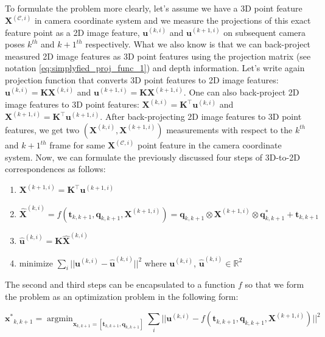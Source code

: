 \documentclass[a4paper]{report}
\numberwithin{figure}{section}
\newcommand{\argmin}{\mathop{\mathrm{argmin}}}
\newcommand{\R}{\mathbb{R}}
\begin{document}
To formulate the problem more clearly, let's assume we have a 3D point feature 
$\mathbf{X}^{(\mathcal{C}, i)}$ in camera coordinate system and 
we measure 
the projections of this exact feature point as a 2D image feature, 
$\mathbf{u}^{(k,i)}$ and $\mathbf{u}^{(k+1,i)}$ on subsequent 
camera poses $k^{th}$ and $k+1^{th}$ respectively. What we also know is that 
we can back-project measured 2D image features as 3D point features using 
the projection matrix (see notation \eqref{eq:simplyfied_proj_func_1}) and 
depth 
information. Let's write again projection function that converts 3D point 
features to 2D image features: $\mathbf{u}^{(k,i)} = 
\mathbf{K}\mathbf{X}^{(k,i)}$ and $\mathbf{u}^{(k+1,i)} = 
\mathbf{K}\mathbf{X}^{(k+1,i)}$.
One can also back-project 2D image features to 3D point features: 
$\mathbf{X}^{(k,i)} = \mathbf{K}^\top \mathbf{u}^{(k,i)}$ and 
$\mathbf{X}^{(k+1,i)} = \mathbf{K}^\top \mathbf{u}^{(k+1,i)}$. 
After back-projecting 2D image features to 3D point features, 
we get two 
$(\mathbf{X}^{(k,i)},\mathbf{X}^{(k+1,i)})$ measurements with respect to the 
$k^{th}$
and $k+1^{th}$ frame for  
same $\mathbf{X}^{(\mathcal{C}, i)}$ point feature in the camera coordinate 
system. 
Now, we can formulate the 
previously discussed four steps of 3D-to-2D correspondences as follows:

\begin{enumerate}
  \item $\mathbf{X}^{(k+1,i)} = \mathbf{K}^\top \mathbf{u}^{(k+1,i)}$
  \item $\mathbf{\hat{X}}^{(k,i)} = f(\mathbf{t}_{k,k+1}, \mathbf{q}_{k,k+1}, 
  \mathbf{X}^{(k+1,i)}) = 
    \mathbf{q}_{k,k+1} \otimes \mathbf{X}^{(k+1,i)} \otimes 
    \mathbf{q}_{k,k+1}^* + \mathbf{t}_{k,k+1} $
  \item $\mathbf{\hat{u}}^{(k,i)} = \mathbf{K}\mathbf{\hat{X}}^{(k,i)}$
  \item minimize $\sum_i||\mathbf{u}^{(k,i)} - \mathbf{\hat{u}}^{(k,i)}||^2$ 
  where 
    $\mathbf{u}^{(k,i)}$, $\mathbf{\hat{u}}^{(k,i)} \in \R^2$
\end{enumerate}

The second and third steps can be encapsulated to a function $f$ so that 
we form the problem as an optimization problem in the following form:

\begin{equation}
  \mathbf{x^*}_{k,k+1} = \argmin_{\mathbf{x}_{k,k+1} = [\mathbf{t}_{k,k+1}, 
  \mathbf{q}_{k,k+1}]}
  \sum_i||\mathbf{u}^{(k,i)} - f(\mathbf{t}_{k,k+1}, \mathbf{q}_{k,k+1}, 
  \mathbf{X}^{(k+1,i)})||^2
\end{equation}
\end{document}
